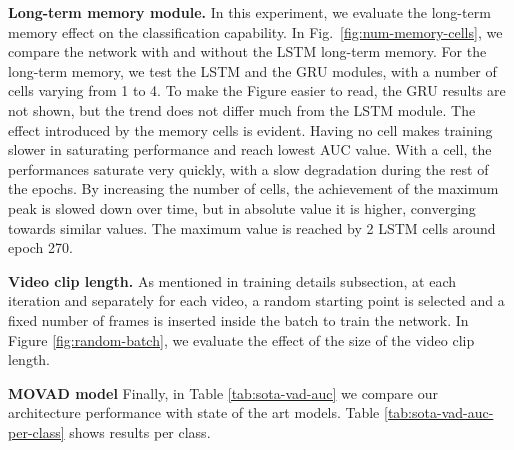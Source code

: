 
\noindent\textbf{Long-term memory module.}
In this experiment, we evaluate the long-term memory effect on the classification capability.
In Fig.~\ref{fig:num-memory-cells}, we compare the network with and without the LSTM long-term memory.
For the long-term memory, we test the LSTM and the GRU \cite{chung2014empirical} modules, with a number of cells varying from 1 to 4.
To make the Figure easier to read, the GRU results are not shown, but the trend does not differ much from the LSTM module. 
The effect introduced by the memory cells is evident.
Having no cell makes training slower in saturating performance and reach lowest AUC value.
With a cell, the performances saturate very quickly, with a slow degradation during the rest of the epochs.
By increasing the number of cells, the achievement of the maximum peak is slowed down over time, but in absolute value it is higher, converging towards similar values.
The maximum value is reached by 2 LSTM cells around epoch 270.


\noindent\textbf{Video clip length.}
As mentioned in training details subsection, at each iteration and separately for each video, a random starting point is selected and a fixed number of frames is inserted inside the batch to train the network.
In Figure \ref{fig:random-batch}, we evaluate the effect of the size of the video clip length.

\noindent\textbf{MOVAD model}
Finally, in Table \ref{tab:sota-vad-auc} we compare our architecture performance with state of the art models.
Table \ref{tab:sota-vad-auc-per-class} shows results per class.